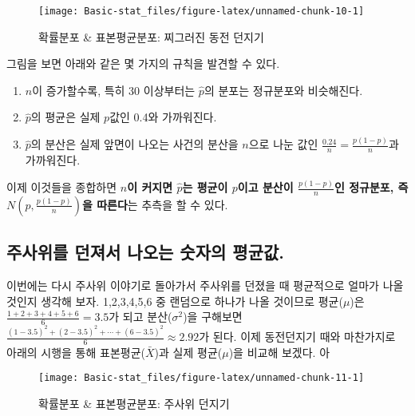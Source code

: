 \documentclass[]{book}
\providecommand{\tightlist}{%
  \setlength{\itemsep}{0pt}\setlength{\parskip}{0pt}}
\begin{document}
\begin{figure}

{\centering \texttt{[image: Basic-stat\_files/figure-latex/unnamed-chunk-10-1]} 

}

\caption{확률분포 \& 표본평균분포: 찌그러진 동전 던지기}\label{fig:unnamed-chunk-10}
\end{figure}

그림을 보면 아래와 같은 몇 가지의 규칙을 발견할 수 있다.

\begin{enumerate}
\def\labelenumi{\arabic{enumi}.}
\tightlist
\item
  \(n\)이 증가할수록, 특히 30 이상부터는 \(\hat{p}\)의 분포는 정규분포와
  비슷해진다.
\item
  \(\hat{p}\)의 평균은 실제 \(p\)값인 0.4와 가까워진다.
\item
  \(\hat{p}\)의 분산은 실제 앞면이 나오는 사건의 분산을 \(n\)으로 나눈
  값인 \(\frac{0.24}{n}=\frac{p(1-p)}{n}\)과 가까워진다.
\end{enumerate}

이제 이것들을 종합하면 \textbf{\(n\)이 커지면 \(\hat{p}\)는 평균이
\(p\)이고 분산이 \(\frac{p(1-p)}{n}\)인 정규분포, 즉
\(N(p,\frac{p(1-p)}{n})\)을 따른다}는 추측을 할 수 있다.

\subsection{주사위를 던져서 나오는 숫자의
평균값.}\label{uxc8fcuxc0acuxc704uxb97c-uxb358uxc838uxc11c-uxb098uxc624uxb294-uxc22buxc790uxc758-uxd3c9uxade0uxac12.}

이번에는 다시 주사위 이야기로 돌아가서 주사위를 던졌을 때 평균적으로
얼마가 나올 것인지 생각해 보자. 1,2,3,4,5,6 중 랜덤으로 하나가 나올
것이므로 평균(\(\mu\))은 \(\frac{1+2+3+4+5+6}{6}=3.5\)가 되고
분산(\(\sigma^2\))을 구해보면
\(\frac{(1-3.5)^2+(2-3.5)^2+\cdots+(6-3.5)^2}{6}\approx 2.92\)가 된다.
이제 동전던지기 때와 마찬가지로 아래의 시행을 통해
표본평균(\(\bar{X}\))과 실제 평균(\(\mu\))을 비교해 보겠다. 아

\begin{figure}

{\centering \texttt{[image: Basic-stat\_files/figure-latex/unnamed-chunk-11-1]} 

}

\caption{확률분포 \& 표본평균분포: 주사위 던지기}\label{fig:unnamed-chunk-11}
\end{figure}
\end{document}
